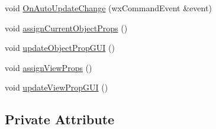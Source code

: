 \begin{DoxyCompactItemize}
void \hyperlink{classGUIMainWindow_a6934b1307d1d32822c20505487cc79bf}{On\-Auto\-Update\-Change} (wx\-Command\-Event \&event)
\item 
void \hyperlink{classGUIMainWindow_a1cb2c4f39b9ba971d51ab682f29b7f23}{assign\-Current\-Object\-Props} ()
\item 
void \hyperlink{classGUIMainWindow_a4c520b8716196fa1e88a7bea5ec34ef0}{update\-Object\-Prop\-G\-U\-I} ()
\item 
void \hyperlink{classGUIMainWindow_ab73ac039ffebd656aa3dc0eac2fcf74f}{assign\-View\-Props} ()
\item 
void \hyperlink{classGUIMainWindow_a2af54fc375be6b0fb938b8562980e723}{update\-View\-Prop\-G\-U\-I} ()
\end{DoxyCompactItemize}
\subsection*{Private Attribute}
